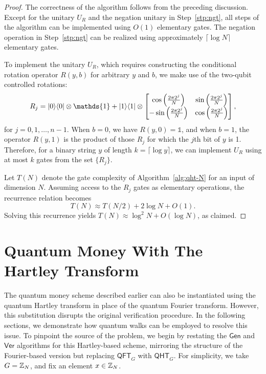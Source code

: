 \documentclass[11pt]{article}
\theoremstyle{definition}
\newcommand{\qht}{\mathsf{QHT}}
\newcommand{\qft}{\mathsf{QFT}}
\newcommand{\gen}{\mathsf{Gen}}
\newcommand{\ver}{\mathsf{Ver}}
\begin{document}
\begin{proof}
    The correctness of the algorithm follows from the preceding discussion. Except for the unitary \( U_R \) and the negation unitary in Step~\ref{stp:ngt}, all steps of the algorithm can be implemented using \( O(1) \) elementary gates. The negation operation in Step~\ref{stp:ngt} can be realized using approximately \( \lceil \log N \rceil \) elementary gates.
    
    To implement the unitary \( U_R \), which requires constructing the conditional rotation operator \( R(y, b) \) for arbitrary \( y \) and \( b \), we make use of the two-qubit controlled rotations:
    \[
    R_j = \ket{0}\bra{0} \otimes \mathds{1} + \ket{1}\bra{1} \otimes
    \begin{bmatrix}
    \cos\left(\frac{2\pi 2^j}{N}\right) & \sin\left(\frac{2\pi 2^j}{N}\right) \\
    -\sin\left(\frac{2\pi 2^j}{N}\right) & \cos\left(\frac{2\pi 2^j}{N}\right)
    \end{bmatrix},
    \]
    for \( j = 0, 1, \dots, n - 1 \). When \( b = 0 \), we have \( R(y, 0) = \mathds{1} \), and when \( b = 1 \), the operator \( R(y, 1) \) is the product of those \( R_j \) for which the \( j \)th bit of \( y \) is 1. Therefore, for a binary string \( y \) of length \( k = \lceil \log y \rceil \), we can implement \( U_R \) using at most \( k \) gates from the set \( \{R_j\} \).
    
    Let \( T(N) \) denote the gate complexity of Algorithm~\ref{alg:qht-N} for an input of dimension \( N \). Assuming access to the \( R_j \) gates as elementary operations, the recurrence relation becomes
    \[
    T(N) \approx T(N / 2) + 2\log N + O(1).
    \]
    Solving this recurrence yields \( T(N) \approx \log^2 N + O(\log N) \), as claimed.
    \end{proof}
    



\section{Quantum Money With The Hartley Transform}
\label{sec:qm_hartley}

The quantum money scheme described earlier can also be instantiated using the quantum Hartley transform in place of the quantum Fourier transform. However, this substitution disrupts the original verification procedure. In the following sections, we demonstrate how quantum walks can be employed to resolve this issue. To pinpoint the source of the problem, we begin by restating the \( \gen \) and \( \ver \) algorithms for this Hartley-based scheme, mirroring the structure of the Fourier-based version but replacing \( \qft_G \) with \( \qht_G \). For simplicity, we take \( G = \mathbb{Z}_N \), and fix an element \( x \in \mathbb{Z}_N \).
\end{document}
